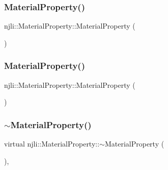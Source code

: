 \subsubsection{\texorpdfstring{Material\+Property()}{MaterialProperty()}\hspace{0.1cm}{\footnotesize\ttfamily [2/3]}}
{\footnotesize\ttfamily njli\+::\+Material\+Property\+::\+Material\+Property (\begin{DoxyParamCaption}\item[{const \mbox{\hyperlink{classnjli_1_1_abstract_builder}{Abstract\+Builder}} \&}]{ }\end{DoxyParamCaption})\hspace{0.3cm}{\ttfamily [protected]}}

\mbox{\label{classnjli_1_1_material_property_a7c76ca284edd6d7ac17b90ec0f0367f1}} 
\subsubsection{\texorpdfstring{Material\+Property()}{MaterialProperty()}\hspace{0.1cm}{\footnotesize\ttfamily [3/3]}}
{\footnotesize\ttfamily njli\+::\+Material\+Property\+::\+Material\+Property (\begin{DoxyParamCaption}\item[{const \mbox{\hyperlink{classnjli_1_1_material_property}{Material\+Property}} \&}]{ }\end{DoxyParamCaption})\hspace{0.3cm}{\ttfamily [protected]}}

\mbox{\label{classnjli_1_1_material_property_a75c8490c52755625c177afc58c229a93}} 
\subsubsection{\texorpdfstring{$\sim$\+Material\+Property()}{~MaterialProperty()}}
{\footnotesize\ttfamily virtual njli\+::\+Material\+Property\+::$\sim$\+Material\+Property (\begin{DoxyParamCaption}{ }\end{DoxyParamCaption})\hspace{0.3cm}{\ttfamily [protected]}, {\ttfamily [virtual]}}



